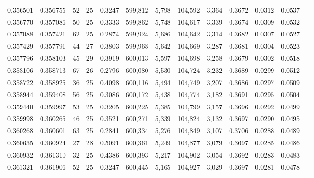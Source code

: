 \begin{tabular}{rrrrrrrrrrrrr}
0.356501 & 0.356755 &  52 &  25 &                                     0.3247 & 599,812 &   5,798 & 104,592 &   3,364 & 0.3672 & 0.0312 & 0.0537 \\
0.356770 & 0.357086 &  50 &  25 &                                     0.3333 & 599,862 &   5,748 & 104,617 &   3,339 & 0.3674 & 0.0309 & 0.0532 \\
0.357088 & 0.357421 &  62 &  25 &                                     0.2874 & 599,924 &   5,686 & 104,642 &   3,314 & 0.3682 & 0.0307 & 0.0527 \\
0.357429 & 0.357791 &  44 &  27 &                                     0.3803 & 599,968 &   5,642 & 104,669 &   3,287 & 0.3681 & 0.0304 & 0.0523 \\
0.357796 & 0.358103 &  45 &  29 &                                     0.3919 & 600,013 &   5,597 & 104,698 &   3,258 & 0.3679 & 0.0302 & 0.0518 \\
0.358106 & 0.358713 &  67 &  26 &                                     0.2796 & 600,080 &   5,530 & 104,724 &   3,232 & 0.3689 & 0.0299 & 0.0512 \\
0.358722 & 0.358925 &  36 &  25 &                                     0.4098 & 600,116 &   5,494 & 104,749 &   3,207 & 0.3686 & 0.0297 & 0.0509 \\
0.358944 & 0.359408 &  56 &  25 &                                     0.3086 & 600,172 &   5,438 & 104,774 &   3,182 & 0.3691 & 0.0295 & 0.0504 \\
0.359440 & 0.359997 &  53 &  25 &                                     0.3205 & 600,225 &   5,385 & 104,799 &   3,157 & 0.3696 & 0.0292 & 0.0499 \\
0.359998 & 0.360265 &  46 &  25 &                                     0.3521 & 600,271 &   5,339 & 104,824 &   3,132 & 0.3697 & 0.0290 & 0.0495 \\
0.360268 & 0.360601 &  63 &  25 &                                     0.2841 & 600,334 &   5,276 & 104,849 &   3,107 & 0.3706 & 0.0288 & 0.0489 \\
0.360635 & 0.360924 &  27 &  28 &                                     0.5091 & 600,361 &   5,249 & 104,877 &   3,079 & 0.3697 & 0.0285 & 0.0486 \\
0.360932 & 0.361310 &  32 &  25 &                                     0.4386 & 600,393 &   5,217 & 104,902 &   3,054 & 0.3692 & 0.0283 & 0.0483 \\
0.361321 & 0.361906 &  52 &  25 &                                     0.3247 & 600,445 &   5,165 & 104,927 &   3,029 & 0.3697 & 0.0281 & 0.0478 \\

\end{tabular}
